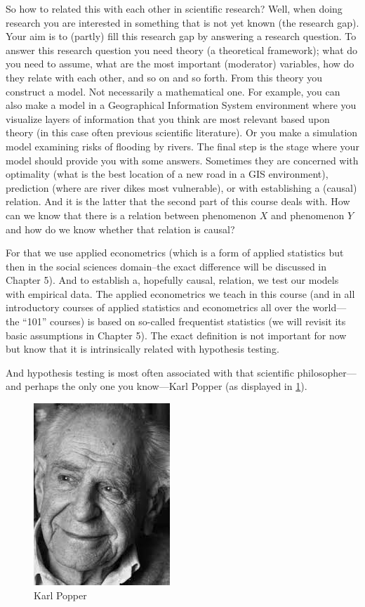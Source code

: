 \documentclass[
]{book}
\begin{document}
So how to related this with each other in scientific research? Well, when doing research you are interested in something that is not yet known (the research gap). Your aim is to (partly) fill this research gap by answering a research question. To answer this research question you need theory (a theoretical framework); what do you need to assume, what are the most important (moderator) variables, how do they relate with each other, and so on and so forth. From this theory you construct a model. Not necessarily a mathematical one. For example, you can also make a model in a Geographical Information System environment where you visualize layers of information that you think are most relevant based upon theory (in this case often previous scientific literature). Or you make a simulation model examining risks of flooding by rivers. The final step is the stage where your model should provide you with some answers. Sometimes they are concerned with optimality (what is the best location of a new road in a GIS environment), prediction (where are river dikes most vulnerable), or with establishing a (causal) relation. And it is the latter that the second part of this course deals with. How can we know that there is a relation between phenomenon \(X\) and phenomenon \(Y\) and how do we know whether that relation is causal?

For that we use applied econometrics (which is a form of applied statistics but then in the social sciences domain--the exact difference will be discussed in Chapter 5). And to establish a, hopefully causal, relation, we test our models with empirical data. The applied econometrics we teach in this course (and in all introductory courses of applied statistics and econometrics all over the world---the ``101'' courses) is based on so-called frequentist statistics (we will revisit its basic assumptions in Chapter 5). The exact definition is not important for now but know that it is intrinsically related with hypothesis testing.

And hypothesis testing is most often associated with that scientific philosopher---and perhaps the only one you know---Karl Popper (as displayed in \ref{fig:popper}).

\begin{figure}
\centering
\includegraphics{./figures/popper.jpeg}
\caption{\label{fig:popper}Karl Popper}
\end{figure}
\end{document}
